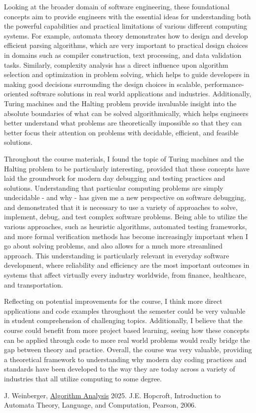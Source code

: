 \documentclass{article}
\theoremstyle{theorem}
\theoremstyle{definition}
\theoremstyle{remark}
\begin{document}
Looking at the broader domain of software engineering, these foundational concepts aim to provide engineers with the essential ideas for understanding both the powerful capabilities and practical limitations of various different computing systems. For example, automata theory demonstrates how to design and develop efficient parsing algorithms, which are very important to practical design choices in domains such as compiler construction, text processing, and data validation tasks. Similarly, complexity analysis has a direct influence upon algorithm selection and optimization in problem solving, which helps to guide developers in making good decisions surrounding the design choices in scalable, performance-oriented software solutions in real world applications and industries. Additionally, Turing machines and the Halting problem provide invaluable insight into the absolute boundaries of what can be solved algorithmically, which helps engineers better understand what problems are theoretically impossible so that they can better focus their attention on problems with decidable, efficient, and feasible solutions.

Throughout the course materials, I found the topic of Turing machines and the Halting problem to be particularly interesting, provided that these concepts have laid the groundwork for modern day debugging and testing practices and solutions. Understanding that particular computing problems are simply undecidable - and why - has given me a new perspective on software debugging, and demonstrated that it is necessary to use a variety of approaches to solve, implement, debug, and test complex software problems. Being able to utilize the various approaches, such as heuristic algorithms, automated testing frameworks, and more formal verification methods has become increasingly important when I go about solving problems, and also allows for a much more streamlined approach. This understanding is particularly relevant in everyday software development, where reliability and efficiency are the most important outcomes in systems that affect virtually every industry worldwide, from finance, healthcare, and transportation. 

Reflecting on potential improvements for the course, I think more direct applications and code examples throughout the semester could be very valuable in student comprehension of challenging topics. Additionally, I believe that the course could benefit from more project based learning, seeing how these concepts can be applied through code to more real world problems would really bridge the gap between theory and practice. Overall, the course was very valuable, providing a theoretical framework to understanding why modern day coding practices and standards have been developed to the way they are today across a variety of industries that all utilize computing to some degree.


\begin{thebibliography}{99}
 J. Weinberger, \href{https://github.com/jonweinb/algorithm-analysis-2025}{Algorithm Analysis} 2025.
 J.E. Hopcroft, {Introduction to Automata Theory, Language, and Computation}, Pearson, 2006.
\end{thebibliography}
\end{document}
